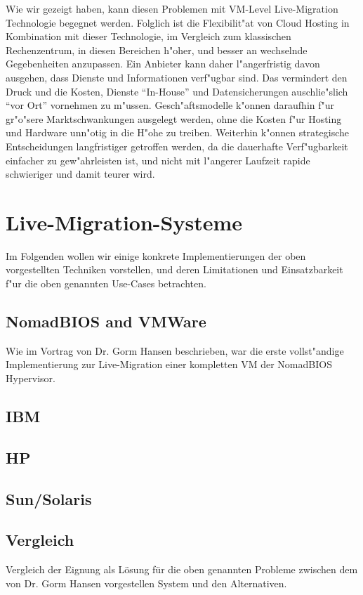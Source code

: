 \documentclass[draft,journal]{IEEEtran}
\begin{document}
Wie wir gezeigt haben, kann diesen Problemen mit VM-Level
Live-Migration Technologie begegnet werden. Folglich ist die
Flexibilit"at von Cloud Hosting in Kombination mit dieser Technologie,
im Vergleich zum klassischen Rechenzentrum, in diesen Bereichen
h"oher, und besser an wechselnde Gegebenheiten anzupassen. Ein
Anbieter kann daher l"angerfristig davon ausgehen, dass Dienste und
Informationen verf"ugbar sind. Das vermindert den Druck und die
Kosten, Dienste "`In-House"' und Datensicherungen auschlie"slich "`vor
Ort"' vornehmen zu m"ussen. Gesch"aftsmodelle k"onnen daraufhin f"ur
gr"o"sere Marktschwankungen ausgelegt werden, ohne die Kosten f"ur
Hosting und Hardware unn"otig in die H"ohe zu treiben. Weiterhin
k"onnen strategische Entscheidungen langfristiger getroffen werden, da
die dauerhafte Verf"ugbarkeit einfacher zu gew"ahrleisten ist, und
nicht mit l"angerer Laufzeit rapide schwieriger und damit teurer wird.

\section{Live-Migration-Systeme}
Im Folgenden wollen wir einige konkrete Implementierungen der oben
vorgestellten Techniken vorstellen, und deren Limitationen und
Einsatzbarkeit f"ur die oben genannten Use-Cases betrachten.

\subsection{NomadBIOS and VMWare}
\label{sec:nomadbios--vmware}
Wie im Vortrag von Dr. Gorm Hansen beschrieben, war die erste
vollst"andige Implementierung zur Live-Migration einer kompletten VM
der NomadBIOS Hypervisor.

\subsection{IBM}

\subsection{HP}

\subsection{Sun/Solaris}

\subsection{Vergleich}
Vergleich der Eignung als Lösung für die oben genannten Probleme
zwischen dem von Dr. Gorm Hansen vorgestellen System und den Alternativen.
\end{document}

